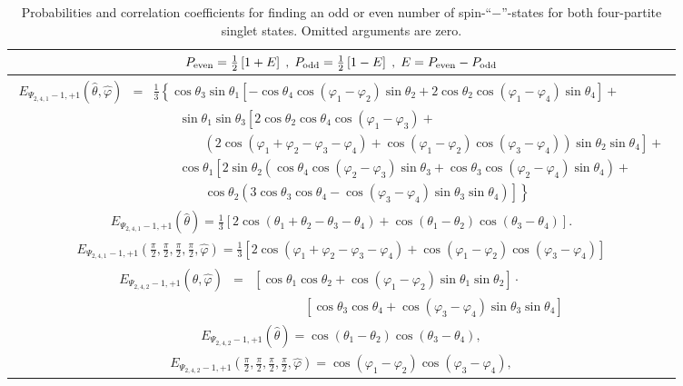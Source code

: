 \documentclass[fleqn,twoside]{article}      %
\begin{document}
\begin{table}
\begin{tabular}{c}
\hline\hline
$
P_{ \rm even} =
{1\over2}\left[1 + E  \right]
\; ,\;
P_{\rm odd} =
{1\over2}\left[1 - E  \right]
\; ,\;
E=
P_{{\rm even}}
-
P_{{\rm odd}}
$
\\
\hline
$
\begin{array}{lll}
E_{{\Psi_{2,4,1}}-1,+1} ({\hat \theta} ,{\hat \varphi})  &=&
\frac{1}{3}
\left\{
\cos \theta_3 \sin \theta_1
\left[
-\cos \theta_4 \cos (\varphi_1 - \varphi_2) \sin \theta_2 +
          2 \cos \theta_2 \cos (\varphi_1 - \varphi_4) \sin \theta_4
\right] +
\right.
\\
&&\qquad
    \sin \theta_1 \sin \theta_3
\left[2 \cos \theta_2 \cos \theta_4 \cos (\varphi_1 - \varphi_3)  +
\right.
\\
&&\qquad
\qquad
\left.
\left(
2 \cos (\varphi_1 + \varphi_2 - \varphi_3 - \varphi_4) +
                \cos (\varphi_1 - \varphi_2)
                \cos (\varphi_3 - \varphi_4)
\right) \sin \theta_2 \sin \theta_4
\right]   +
\\
&&\qquad
    \cos \theta_1
\left[
2 \sin \theta_2
\left(
\cos \theta_4 \cos (\varphi_2 - \varphi_3) \sin \theta_3 +
                \cos \theta_3 \cos (\varphi_2 - \varphi_4) \sin \theta_4
\right) \right.
 +
\\
&&\qquad
\qquad
\left.
\left.
\cos \theta_2
\left(3 \cos \theta_3 \cos \theta_4 -
                \cos (\varphi_3 - \varphi_4) \sin \theta_3
\sin \theta_4
\right)
\right]
\right\}
\end{array}
$
\\
$E_{{\Psi_{2,4,1}}-1,+1} ({\hat \theta} )  =
\frac{1}{3} \left[2 \cos (\theta_1 +\theta_2 -\theta_3 -\theta_4 )+\cos
   (\theta_1 -\theta_2 ) \cos (\theta_3 -\theta_4 )\right].
$
\\
$
E_{{\Psi_{2,4,1}}-1,+1} ( \frac{\pi}{2},\frac{\pi}{2},\frac{\pi}{2},\frac{\pi}{2},\hat \varphi )=
\frac{1}{3} \left[2 \cos (\varphi_1+\varphi_2- \varphi_3 - \varphi_4)
+\cos (\varphi_1-\varphi_2) \cos (\varphi_3-\varphi_4)
\right]
$ \\
\hline
$
\begin{array}{lll}
E_{{\Psi_{2,4,2}}-1,+1}({\hat \theta} , {\hat \varphi } )  &=&
\left[\cos \theta_1 \cos \theta_2 +
          \cos ( \varphi_1 - \varphi_2) \sin \theta_1 \sin \theta_2\right]\cdot \\
&&\qquad  \qquad  \left[\cos \theta_3 \cos \theta_4 +
          \cos (\varphi_3 - \varphi_4) \sin \theta_3 \sin \theta_4
\right]
\end{array}
$
\\
$E_{{\Psi_{2,4,2}}-1,+1}({\hat \theta} )  =
\cos (\theta_1 -\theta_2 ) \cos (\theta_3 -\theta_4 ),
$
\\
$E_{{\Psi_{2,4,2}}-1,+1}( \frac{\pi}{2},\frac{\pi}{2},\frac{\pi}{2},\frac{\pi}{2},{\hat \varphi} )  =
\cos (\varphi_1 -\varphi_2 ) \cos (\varphi_3 -\varphi_4 ),
$
\\
\hline\hline
\end{tabular}
\caption{Probabilities and correlation coefficients
for finding an odd or even number of spin-``$-$''-states for both four-partite singlet states.
Omitted arguments are zero.
\label{2008-gtq-2part}
}
\end{table}
\end{document}

